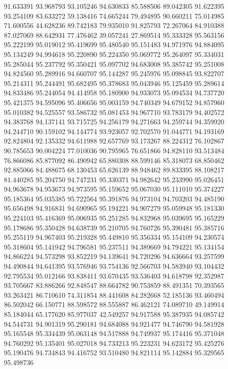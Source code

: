 91.633391
93.968793
93.105246
94.630833
85.588506
89.042305
91.622395
93.254109
83.633272
59.138416
74.665244
79.494895
90.660211
75.014985
71.600556
44.628236
89.742183
79.935010
91.825793
72.267064
84.910388
87.027069
88.642931
77.476462
39.057241
27.869514
95.333328
95.563156
95.222199
95.019012
95.419699
95.480540
95.151483
94.971976
94.884095
95.134249
94.994618
95.220890
95.224350
95.069772
95.264097
95.334031
95.285044
95.237792
95.350421
95.097702
94.683008
95.385742
95.251008
94.824560
95.289916
94.660707
95.144287
95.245976
95.098845
93.822707
95.214311
95.244491
95.682495
95.378683
95.043946
95.125459
95.289614
94.833486
95.244054
94.414958
95.180900
94.933073
95.094534
94.737720
95.421375
94.595096
95.406656
95.003159
94.740349
94.679152
94.857960
95.010382
94.525557
93.586732
95.081453
94.967710
93.783179
94.402572
94.383768
94.137141
93.715725
94.256179
94.271663
94.259744
94.359920
94.244710
90.159102
94.144774
93.923057
92.702570
91.044771
94.193169
92.824804
92.135332
94.611988
92.657769
93.173267
88.224312
76.102867
90.785653
90.004224
77.010036
90.795965
76.651866
94.828110
93.513484
76.866086
85.877092
86.490942
65.880308
88.599146
85.318073
68.850462
92.885066
84.488675
68.130453
65.626139
88.948462
89.833395
88.108217
81.440285
95.204750
94.747231
95.330371
94.982642
95.233990
95.026451
94.963678
94.953673
94.973595
95.159652
95.067030
95.111010
95.374227
95.185364
95.035385
95.722564
95.391876
94.973104
94.703203
94.485190
95.656498
94.916831
94.690965
95.194221
94.907279
95.059948
95.181330
95.224103
95.416369
95.006935
95.251285
94.832968
95.039695
95.165229
95.178686
95.350428
94.638739
95.210705
94.760726
95.390481
95.385716
95.255119
94.967403
95.219328
95.449810
95.356334
95.154109
94.230574
95.318604
95.141942
94.796581
95.237511
94.389669
94.794221
95.134154
94.866224
94.573298
93.852219
94.139641
94.720296
94.636664
93.257599
94.490844
94.641395
93.576946
93.754136
92.566703
94.583940
93.104432
92.795534
95.012166
93.838411
93.670435
93.536403
94.618798
92.352987
93.705667
83.886266
92.848547
88.664782
90.753859
88.491351
70.393565
93.263421
86.710610
74.311854
88.441608
84.282668
52.185136
93.460494
86.502042
66.150771
88.598572
88.555887
86.462121
74.089710
49.149914
85.184044
65.177620
85.977037
42.549257
94.917588
95.387935
94.085742
94.544731
94.901319
95.290181
94.684088
94.921477
94.746790
94.581928
95.165548
95.334439
95.063148
94.517888
94.749937
95.174416
95.371048
94.760292
95.135401
95.027018
94.733213
95.223231
94.623172
95.425276
95.190476
94.734843
94.416752
93.510480
94.821114
95.142884
95.329565
95.498736

